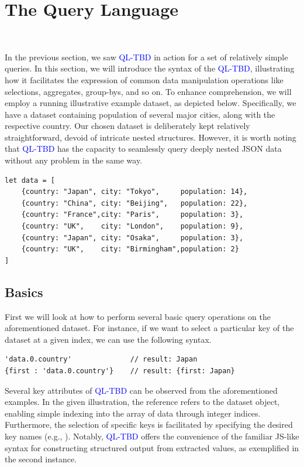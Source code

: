 \documentclass[runningheads]{llncs}
\newcommand{\lang}{\textcolor{blue}{QL-TBD}}
\begin{document}
\section{The Query Language}~\label{sec:query_language}

In the previous section, we saw \lang{} in action for a set of relatively simple queries.
In this section, we will introduce the syntax of the \lang{}, illustrating how it facilitates
the expression of common data manipulation operations like selections, aggregates,
group-bys, and so on.
To enhance comprehension, we will employ a running illustrative example dataset, as
depicted below.
Specifically, we have a dataset containing population of several major cities,
along with the respective country.
Our chosen dataset is deliberately kept relatively straightforward, devoid of
intricate nested structures.
However, it is worth noting that \lang{} has the capacity to seamlessly query
deeply nested JSON data without any problem in the same way.


\begin{lstlisting}[style=JavaScript]
let data = [
    {country: "Japan", city: "Tokyo",     population: 14},
    {country: "China", city: "Beijing",   population: 22},
    {country: "France",city: "Paris",     population: 3},
    {country: "UK",    city: "London",    population: 9},
    {country: "Japan", city: "Osaka",     population: 3},
    {country: "UK",    city: "Birmingham",population: 2}
]
\end{lstlisting}

\subsection{Basics}
First we will look at how to perform several basic query operations on the
aforementioned dataset.
For instance, if we want to select a particular key of the dataset at a given
index, we can use the following syntax.

\begin{lstlisting}[style=JavaScript]
'data.0.country'              // result: Japan
{first : 'data.0.country'}    // result: {first: Japan}
\end{lstlisting}

Several key attributes of \lang{} can be observed from the aforementioned examples.
In the given illustration, the reference  refers to
the dataset object, enabling simple indexing into the array of data through integer
indices.
Furthermore, the selection of specific keys is facilitated by specifying the desired
key names (e.g., ).
Notably, \lang{} offers the convenience of the familiar JS-like syntax for constructing
structured output from extracted values, as exemplified in the second instance.
\end{document}
